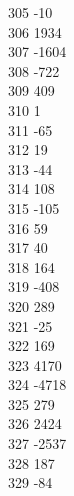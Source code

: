 { 305	-10 \\
 306	1934 \\
 307	-1604 \\
 308	-722 \\
 309	409 \\
 310	1 \\
 311	-65 \\
 312	19 \\
 313	-44 \\
 314	108 \\
 315	-105 \\
 316	59 \\
 317	40 \\
 318	164 \\
 319	-408 \\
 320	289 \\
 321	-25 \\
 322	169 \\
 323	4170 \\
 324	-4718 \\
 325	279 \\
 326	2424 \\
 327	-2537 \\
 328	187 \\
 329	-84 \\
}
